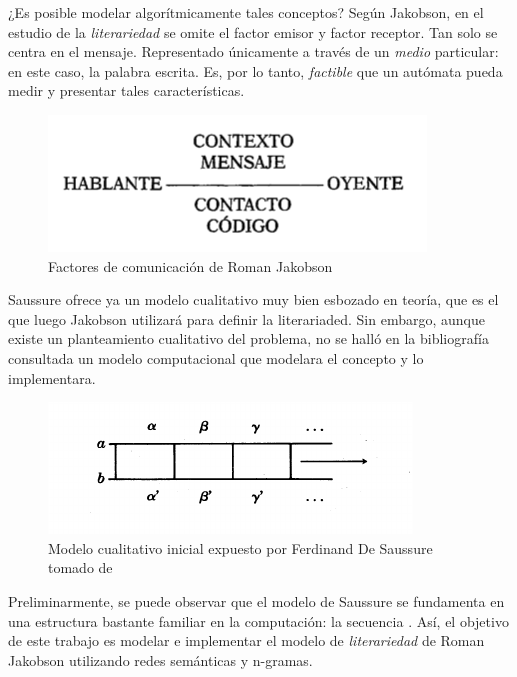 \documentclass[12pt,letterpaper,twoside]{article}
\begin{document}
¿Es posible  modelar algorítmicamente  tales conceptos? Según
Jakobson, en el estudio de la \emph{literariedad} se omite el factor emisor
y factor receptor. Tan solo se centra en el mensaje. Representado
 únicamente a través de un \emph{medio} particular: en este caso, la palabra escrita.
Es, por lo tanto,  \emph{factible} que un autómata pueda medir y presentar tales
características. 

\begin{figure}[htbp]
\centering
\includegraphics[width=.9\linewidth]{./assets/factores_comunicacion.png}
\caption{Factores de comunicación de Roman Jakobson \cite{jakobson1981linguistica}}
\end{figure}

Saussure ofrece ya un modelo cualitativo muy bien esbozado en teoría,
que es el que luego Jakobson utilizará para definir la literariaded.
Sin embargo, aunque existe un planteamiento cualitativo del problema,
no se halló en la bibliografía consultada un modelo computacional que
modelara el concepto y lo implementara. 

\begin{figure}[htbp]
\centering
\includegraphics[width=.9\linewidth]{./assets/delimitacion_saussure.png}
\caption{Modelo cualitativo inicial expuesto por Ferdinand De Saussure tomado de \cite{eijembaum2010teoria}}
\end{figure}

Preliminarmente, se puede observar que el modelo de Saussure se
fundamenta en una estructura bastante familiar en la computación: la
secuencia \cite{alonso1945curso}. Así, el objetivo de este trabajo es modelar e implementar el
modelo de \emph{literariedad} de Roman Jakobson utilizando redes semánticas
y n-gramas.
\end{document}
